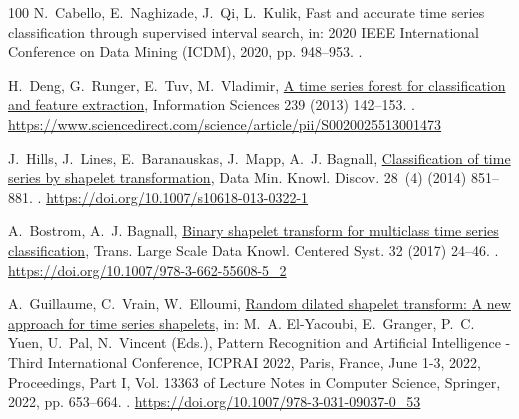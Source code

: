 \documentclass[final,3p,times,twocolumn]{elsarticle}
\begin{document}
\begin{thebibliography}{100}
N.~Cabello, E.~Naghizade, J.~Qi, L.~Kulik, Fast and accurate time series
  classification through supervised interval search, in: 2020 IEEE
  International Conference on Data Mining (ICDM), 2020, pp. 948--953.
\newblock \href {https://doi.org/10.1109/ICDM50108.2020.00107}
  {}.

H.~Deng, G.~Runger, E.~Tuv, M.~Vladimir,
  \href{https://www.sciencedirect.com/science/article/pii/S0020025513001473}{A
  time series forest for classification and feature extraction}, Information
  Sciences 239 (2013) 142--153.
\newblock \href {https://doi.org/https://doi.org/10.1016/j.ins.2013.02.030}
  {}.
\newline\urlprefix\url{https://www.sciencedirect.com/science/article/pii/S0020025513001473}

J.~Hills, J.~Lines, E.~Baranauskas, J.~Mapp, A.~J. Bagnall,
  \href{https://doi.org/10.1007/s10618-013-0322-1}{Classification of time
  series by shapelet transformation}, Data Min. Knowl. Discov. 28~(4) (2014)
  851--881.
\newblock \href {https://doi.org/10.1007/S10618-013-0322-1}
  {}.
\newline\urlprefix\url{https://doi.org/10.1007/s10618-013-0322-1}

A.~Bostrom, A.~J. Bagnall,
  \href{https://doi.org/10.1007/978-3-662-55608-5\_2}{Binary shapelet transform
  for multiclass time series classification}, Trans. Large Scale Data Knowl.
  Centered Syst. 32 (2017) 24--46.
\newblock \href {https://doi.org/10.1007/978-3-662-55608-5\_2}
  {}.
\newline\urlprefix\url{https://doi.org/10.1007/978-3-662-55608-5\_2}

A.~Guillaume, C.~Vrain, W.~Elloumi,
  \href{https://doi.org/10.1007/978-3-031-09037-0\_53}{Random dilated shapelet
  transform: {A} new approach for time series shapelets}, in: M.~A.
  El{-}Yacoubi, E.~Granger, P.~C. Yuen, U.~Pal, N.~Vincent (Eds.), Pattern
  Recognition and Artificial Intelligence - Third International Conference,
  {ICPRAI} 2022, Paris, France, June 1-3, 2022, Proceedings, Part {I}, Vol.
  13363 of Lecture Notes in Computer Science, Springer, 2022, pp. 653--664.
\newblock \href {https://doi.org/10.1007/978-3-031-09037-0\_53}
  {}.
\newline\urlprefix\url{https://doi.org/10.1007/978-3-031-09037-0\_53}


\end{thebibliography}
\end{document}
